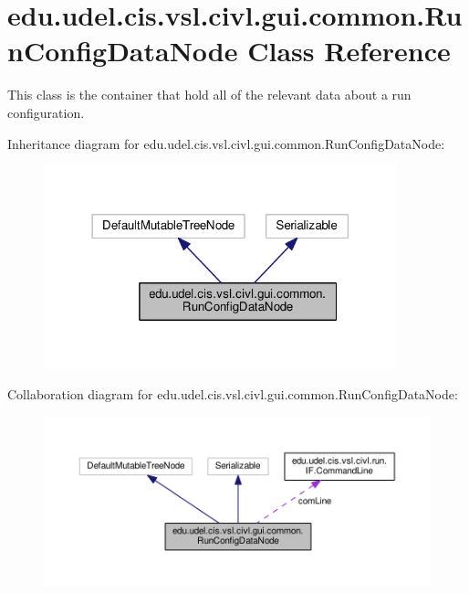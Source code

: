 \hypertarget{classedu_1_1udel_1_1cis_1_1vsl_1_1civl_1_1gui_1_1common_1_1RunConfigDataNode}{}\section{edu.\+udel.\+cis.\+vsl.\+civl.\+gui.\+common.\+Run\+Config\+Data\+Node Class Reference}
\label{classedu_1_1udel_1_1cis_1_1vsl_1_1civl_1_1gui_1_1common_1_1RunConfigDataNode}


This class is the container that hold all of the relevant data about a run configuration.  




Inheritance diagram for edu.\+udel.\+cis.\+vsl.\+civl.\+gui.\+common.\+Run\+Config\+Data\+Node\+:
\nopagebreak
\begin{figure}[H]
\begin{center}
\leavevmode
\includegraphics[width=290pt]{classedu_1_1udel_1_1cis_1_1vsl_1_1civl_1_1gui_1_1common_1_1RunConfigDataNode__inherit__graph}
\end{center}
\end{figure}


Collaboration diagram for edu.\+udel.\+cis.\+vsl.\+civl.\+gui.\+common.\+Run\+Config\+Data\+Node\+:
\nopagebreak
\begin{figure}[H]
\begin{center}
\leavevmode
\includegraphics[width=350pt]{classedu_1_1udel_1_1cis_1_1vsl_1_1civl_1_1gui_1_1common_1_1RunConfigDataNode__coll__graph}
\end{center}
\end{figure}
